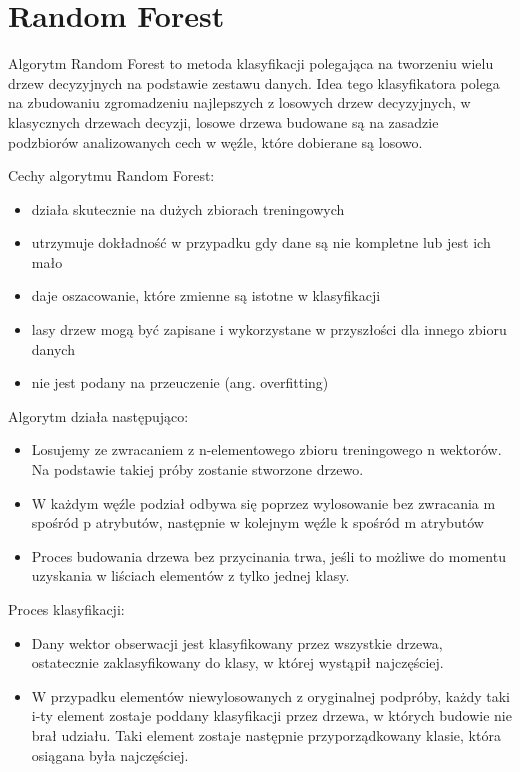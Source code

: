 \documentclass[brudnopis]{xmgr}
\begin{document}
\section{Random Forest}

Algorytm Random Forest to metoda klasyfikacji polegająca na tworzeniu wielu drzew decyzyjnych na podstawie zestawu danych. Idea tego klasyfikatora polega na zbudowaniu zgromadzeniu najlepszych z losowych drzew decyzyjnych, w klasycznych drzewach decyzji, losowe drzewa budowane są na zasadzie podzbiorów analizowanych cech w węźle, które dobierane są losowo.

Cechy algorytmu Random Forest:
\begin{itemize}
\item
działa skutecznie na dużych zbiorach treningowych
\item
utrzymuje dokładność w przypadku gdy dane są nie kompletne lub jest ich mało
\item
daje oszacowanie, które zmienne są istotne w klasyfikacji
\item
lasy drzew mogą być zapisane i wykorzystane w przyszłości dla innego zbioru danych
\item
nie jest podany na przeuczenie (ang. overfitting)
\end{itemize}

Algorytm działa następująco:
\begin{itemize}
\item
Losujemy ze zwracaniem z n-elementowego zbioru treningowego n wektorów. Na podstawie takiej próby zostanie stworzone drzewo.
\item
W każdym węźle podział odbywa się poprzez wylosowanie bez zwracania m spośród p atrybutów, następnie w kolejnym węźle k spośród m atrybutów
\item
Proces budowania drzewa bez przycinania trwa, jeśli to możliwe do momentu uzyskania w liściach elementów z tylko jednej klasy.
\end{itemize}

Proces klasyfikacji:
\begin{itemize}
\item
Dany wektor obserwacji jest klasyfikowany przez wszystkie drzewa, ostatecznie zaklasyfikowany do klasy, w której wystąpił najczęściej.
\item
W przypadku elementów niewylosowanych z oryginalnej podpróby, każdy taki i-ty element zostaje poddany klasyfikacji przez drzewa, w których budowie nie brał udziału. Taki element zostaje następnie przyporządkowany klasie, która osiągana była najczęściej.
\end{itemize}
\end{document}
